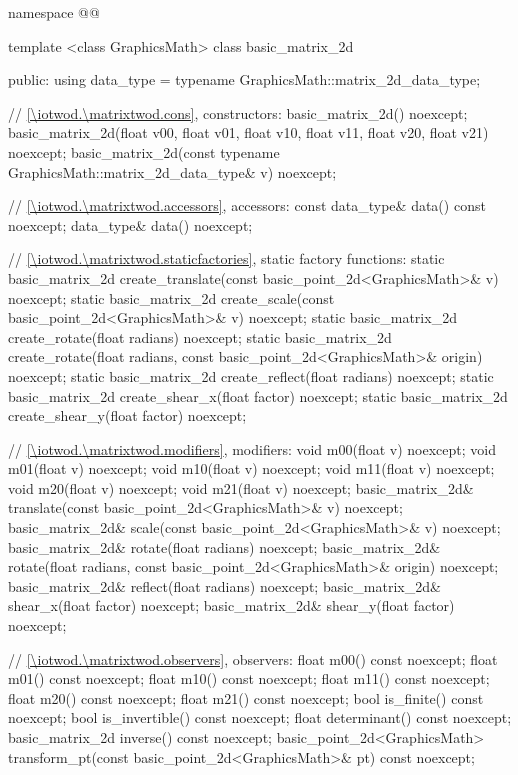 \begin{codeblock}
namespace @\fullnamespace{}@ {
  template <class GraphicsMath>
  class basic_matrix_2d {
  public:
    using data_type = typename GraphicsMath::matrix_2d_data_type;
    
    // \ref{\iotwod.\matrixtwod.cons}, constructors:
    basic_matrix_2d() noexcept;
    basic_matrix_2d(float v00, float v01, float v10, float v11, float v20, float v21) noexcept;
    basic_matrix_2d(const typename GraphicsMath::matrix_2d_data_type& v) noexcept;

    // \ref{\iotwod.\matrixtwod.accessors}, accessors:
    const data_type& data() const noexcept;
    data_type& data() noexcept;

    // \ref{\iotwod.\matrixtwod.staticfactories}, static factory functions:
    static basic_matrix_2d create_translate(const basic_point_2d<GraphicsMath>& v) noexcept;
    static basic_matrix_2d create_scale(const basic_point_2d<GraphicsMath>& v) noexcept;
    static basic_matrix_2d create_rotate(float radians) noexcept;
    static basic_matrix_2d create_rotate(float radians,
      const basic_point_2d<GraphicsMath>& origin) noexcept;
    static basic_matrix_2d create_reflect(float radians) noexcept;
    static basic_matrix_2d create_shear_x(float factor) noexcept;
    static basic_matrix_2d create_shear_y(float factor) noexcept;

    // \ref{\iotwod.\matrixtwod.modifiers}, modifiers:
    void m00(float v) noexcept;
    void m01(float v) noexcept;
    void m10(float v) noexcept;
    void m11(float v) noexcept;
    void m20(float v) noexcept;
    void m21(float v) noexcept;
    basic_matrix_2d& translate(const basic_point_2d<GraphicsMath>& v) noexcept;
    basic_matrix_2d& scale(const basic_point_2d<GraphicsMath>& v) noexcept;
    basic_matrix_2d& rotate(float radians) noexcept;
    basic_matrix_2d& rotate(float radians, const basic_point_2d<GraphicsMath>& origin) noexcept;
    basic_matrix_2d& reflect(float radians) noexcept;
    basic_matrix_2d& shear_x(float factor) noexcept;
    basic_matrix_2d& shear_y(float factor) noexcept;

    // \ref{\iotwod.\matrixtwod.observers}, observers:
    float m00() const noexcept;
    float m01() const noexcept;
    float m10() const noexcept;
    float m11() const noexcept;
    float m20() const noexcept;
    float m21() const noexcept;
    bool is_finite() const noexcept;
    bool is_invertible() const noexcept;
    float determinant() const noexcept;
    basic_matrix_2d inverse() const noexcept;
    basic_point_2d<GraphicsMath> transform_pt(const basic_point_2d<GraphicsMath>& pt)
      const noexcept;

}}
\end{codeblock}

